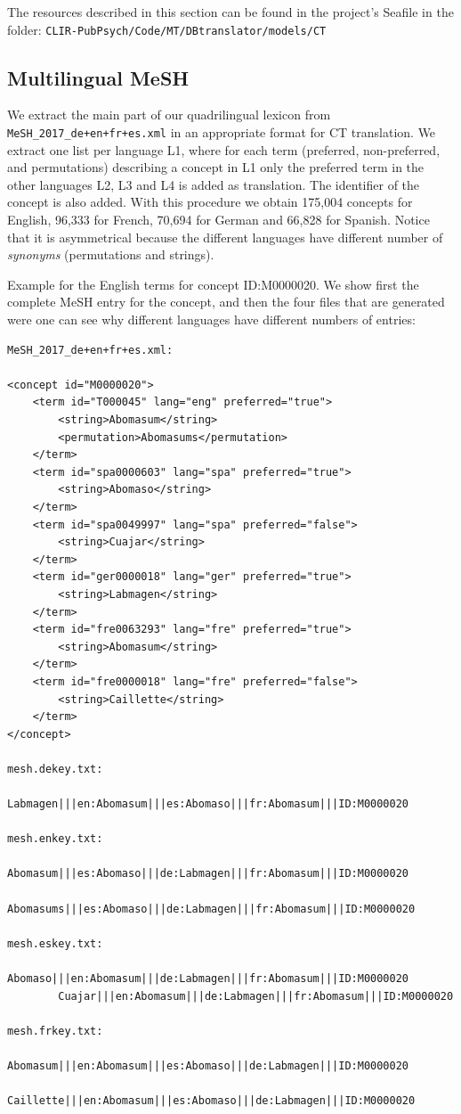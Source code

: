 \documentclass[a4paper,11pt]{article}
\begin{document}
The resources described in this section can be found in the project's Seafile in the folder:
{\tt CLIR-PubPsych/Code/MT/DBtranslator/models/CT} 


\subsection{Multilingual MeSH}
\label{ss:meshLex}

We extract the main part of our quadrilingual lexicon from {\tt MeSH\_2017\_de+en+fr+es.xml} in an appropriate format for CT translation. We extract one list per language L1, where for each term (preferred, non-preferred, and permutations) describing a concept in L1 only the preferred term in the other languages L2, L3 and L4 is added as translation. The identifier of the concept is also added. With this procedure we obtain 175,004 concepts for English, 96,333 for French, 70,694 for German and 66,828 for Spanish. Notice that it is asymmetrical because the different languages have different number of \emph{synonyms} (permutations and strings).

\bigskip
\noindent Example for the English terms for concept ID:M0000020. We show first the complete MeSH entry for the concept, and then the four files that are generated were one can see why different languages have different numbers of entries:

{\small 
\begin{verbatim}
MeSH_2017_de+en+fr+es.xml:
 
<concept id="M0000020">
	<term id="T000045" lang="eng" preferred="true">
		<string>Abomasum</string>
		<permutation>Abomasums</permutation>
	</term>
	<term id="spa0000603" lang="spa" preferred="true">
		<string>Abomaso</string>
	</term>
	<term id="spa0049997" lang="spa" preferred="false">
		<string>Cuajar</string>
	</term>
	<term id="ger0000018" lang="ger" preferred="true">
		<string>Labmagen</string>
	</term>
	<term id="fre0063293" lang="fre" preferred="true">
		<string>Abomasum</string>
	</term>
	<term id="fre0000018" lang="fre" preferred="false">
		<string>Caillette</string>
	</term>
</concept>

mesh.dekey.txt:
        Labmagen|||en:Abomasum|||es:Abomaso|||fr:Abomasum|||ID:M0000020
  
mesh.enkey.txt:
        Abomasum|||es:Abomaso|||de:Labmagen|||fr:Abomasum|||ID:M0000020
        Abomasums|||es:Abomaso|||de:Labmagen|||fr:Abomasum|||ID:M0000020
        
mesh.eskey.txt:       
        Abomaso|||en:Abomasum|||de:Labmagen|||fr:Abomasum|||ID:M0000020
        Cuajar|||en:Abomasum|||de:Labmagen|||fr:Abomasum|||ID:M0000020

mesh.frkey.txt:  
        Abomasum|||en:Abomasum|||es:Abomaso|||de:Labmagen|||ID:M0000020
        Caillette|||en:Abomasum|||es:Abomaso|||de:Labmagen|||ID:M0000020
\end{verbatim}
}
\end{document}
